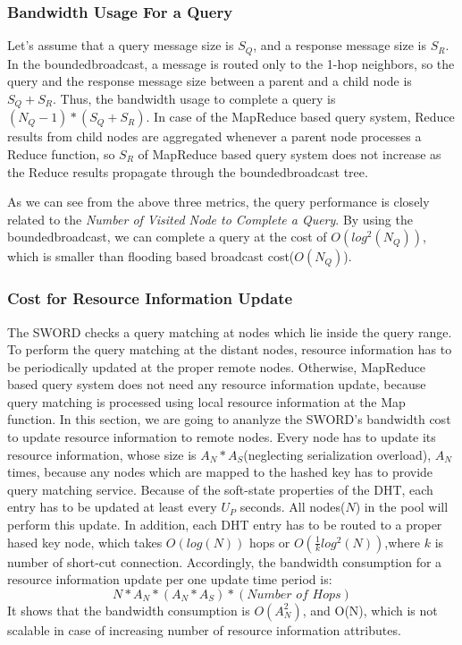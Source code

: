 \documentclass{acm_proc_article-sp}
\begin{document}
\subsubsection{Bandwidth Usage For a Query}
Let's assume that a query message size is $S_Q$, and a response message size is $S_R$.
In the boundedbroadcast, a message is routed only to the 1-hop neighbors, so the query and the response message size between a parent and a child node is $S_Q+S_R$.
Thus, the bandwidth usage to complete a query is \begin{math}(N_Q-1)*(S_Q+S_R)\end{math}.
In case of the MapReduce based query system, Reduce results from child nodes are aggregated whenever a parent node processes a Reduce function, so $S_R$ of MapReduce based query system does not increase
as the Reduce results propagate through the boundedbroadcast tree.

As we can see from the above three metrics, the query performance is closely related to the \textit{Number of Visited Node to Complete a Query}. By using the boundedbroadcast, we can complete a query
at the cost of \begin{math}O(log^2(N_Q))\end{math}, which is smaller than flooding based broadcast cost(\begin{math}O(N_Q)\end{math}).
\subsubsection{Cost for Resource Information Update}
The SWORD checks a query matching at nodes which lie inside the query range. To perform the query matching at the distant nodes, resource information has to be periodically updated at the proper remote nodes.
Otherwise, MapReduce based query system does not need any resource information update, because query matching is processed using local resource information at the Map function.
In this section, we are going to ananlyze the SWORD's bandwidth cost to update resource information to remote nodes.
Every node has to update its resource information, whose size is $A_N*A_S$(neglecting serialization overload), $A_N$ times, because any nodes which are mapped to the hashed key has to provide query matching service. 
Because of the soft-state properties of the DHT, each entry has to be updated at least every $U_P$ seconds. All nodes($N$) in the pool will perform this update.
In addition, each DHT entry has to be routed to a proper hased key node, which takes $O(log(N))$ hops\cite{chord}\cite{pastry} or \begin{math}O(\frac{1}{k}log^2(N))\end{math},where $k$ is number of short-cut connection\cite{brunet}.
Accordingly, the bandwidth consumption for a resource information update per one update time period is:
\begin{displaymath}N*A_N*(A_N*A_S)*(\textit{Number of Hops})\end{displaymath}
It shows that the bandwidth consumption is $O(A_N^2)$, and O(N), which is not scalable in case of increasing number of resource information attributes.
\end{document}
